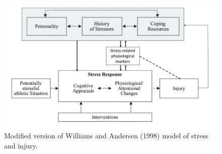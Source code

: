 \documentclass[
  english,
  man,floatsintext]{apa6}
\begin{document}
\begin{figure}

{\centering \includegraphics[width=1\linewidth]{figs/wa_new3} 

}

\caption{Modified version of Williams and Andersen (1998) model of stress and injury.}\label{fig:wanew}
\end{figure}
\end{document}
